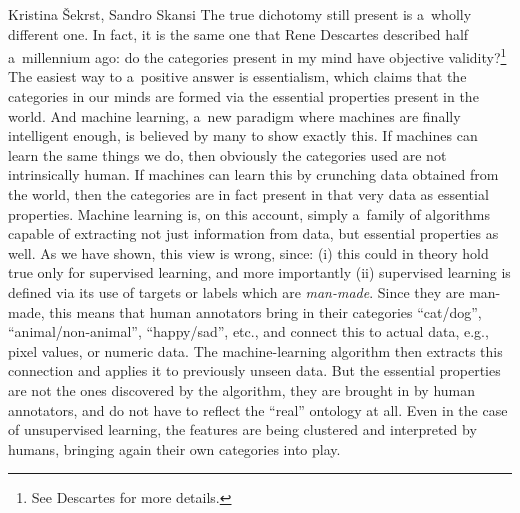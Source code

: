 \begin{artengenv2auth}{Kristina Šekrst, Sandro Skansi}
The true dichotomy still present is a~wholly different one. In fact, it is the same one that Rene Descartes described half a~millennium ago: do the categories present in my mind have objective validity?\footnote{See Descartes
\parencites*[][]{descartes_renati_1641}[English translation:][]{descartes_meditations_1991} %
 for more details.} The easiest way to a~positive answer is essentialism, which claims that the categories in our minds are formed via the essential properties present in the world. And machine learning, a~new paradigm where machines are finally intelligent enough, is believed by many to show exactly this. If machines can learn the same things we do, then obviously the categories used are not intrinsically human. If machines can learn this by crunching data obtained from the world, then the categories are in fact present in that very data as essential properties. Machine learning is, on this account, simply a~family of algorithms capable of extracting not just information from data, but essential properties as well. As we have shown, this view is wrong, since: (i) this could in theory hold true only for supervised learning, and more importantly (ii) supervised learning is defined via its use of targets or labels which are \textit{man-made}. Since they are man-made, this means that human annotators bring in their categories ``cat/dog'', ``animal/non-animal'', ``happy/sad'', etc., and connect this to actual data, e.g., pixel values, or numeric data. The machine-learning algorithm then extracts this connection and applies it to previously unseen data. But the essential properties are not the ones discovered by the algorithm, they are brought in by human annotators, and do not have to reflect the ``real'' ontology at all. Even in the case of unsupervised learning, the features are being clustered and interpreted by humans, bringing again their own categories into play.


\end{artengenv2auth}
